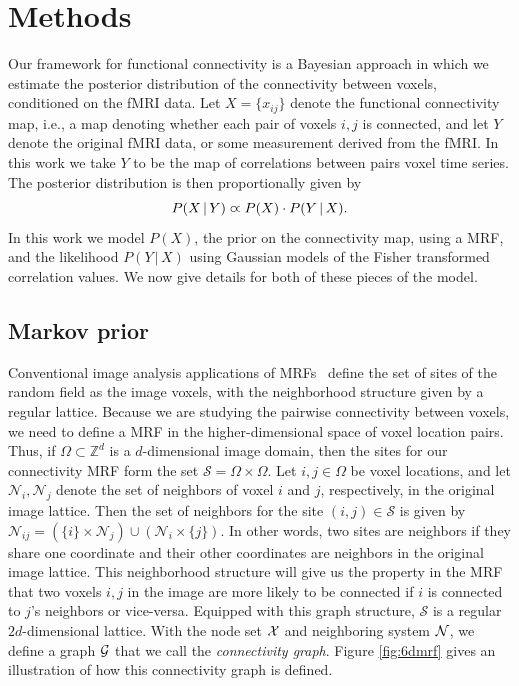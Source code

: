 \section{Methods}
\label{sec:methods}
Our framework for functional connectivity is a Bayesian approach in which we
estimate the posterior distribution of the connectivity between voxels,
conditioned on the fMRI data. Let $X = \{x_{ij}\}$ denote the functional
connectivity map, i.e., a map denoting whether each pair of voxels $i,j$ is
connected, and let $Y$ denote the original fMRI data, or some measurement
derived from the fMRI. In this work we take $Y$ to be the map of correlations
between pairs voxel time series. The posterior distribution is then
proportionally given by
\begin{equation}
\label{eq:posterior}
P(X \, | \, Y) \varpropto P(X) \cdot P(Y \, | \, X).
\end{equation}
In this work we model $P(X)$, the prior on the connectivity map, using a
MRF, and the likelihood $P(Y \, | \, X)$ using Gaussian models of the
Fisher transformed correlation values. We now give details for both of these
pieces of the model.


\subsection{Markov prior}
Conventional image analysis applications of MRFs~\cite{li_markov_2009} define
the set of sites of the random field as the image voxels, with the neighborhood
structure given by a regular lattice. Because we are studying the pairwise
connectivity between voxels, we need to define a MRF in the higher-dimensional
space of voxel location pairs. Thus, if $\Omega \subset \mathbb{Z}^d$ is a
$d$-dimensional image domain, then the sites for our connectivity MRF form the
set $\mathcal{S} = \Omega \times \Omega$. Let $i, j \in \Omega$ be voxel
locations, and let $\mathcal{N}_i, \mathcal{N}_j$ denote the set of neighbors of
voxel $i$ and $j$, respectively, in the original image lattice. Then the set of
neighbors for the site $(i, j) \in \mathcal{S}$ is given by $\mathcal{N}_{ij} =
(\{i\} \times \mathcal{N}_j) \cup (\mathcal{N}_i \times \{j\})$. In other words,
two sites are neighbors if they share one coordinate and their other coordinates
are neighbors in the original image lattice. This neighborhood structure will
give us the property in the MRF that two voxels $i, j$ in the image are more
likely to be connected if $i$ is connected to $j$'s neighbors or
vice-versa. Equipped with this graph structure, $\mathcal{S}$ is a regular
$2d$-dimensional lattice. With the node set $\mathcal{X}$ and neighboring system $\mathcal{N}$,
we define a graph $\mathcal{G}$ that we call the {\em connectivity graph}. Figure
\ref{fig:6dmrf} gives an illustration of how this connectivity graph is defined.

